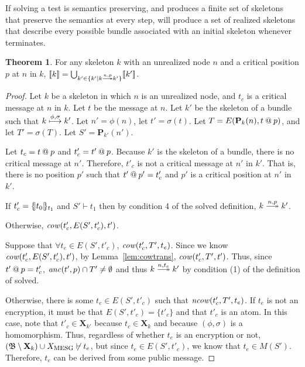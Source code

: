 \documentclass[12pt]{article}
\theoremstyle{definition}
\newtheorem{thm}{Theorem}[section]
\newcommand{\scap}[1]{\ensuremath{\mathop{\relax
                    \smash{\mbox{\sc#1}}}\!\mathop{\vphantom{#1}}\nolimits}}
\newcommand{\base}{\ensuremath{\mathfrak B}}
\newcommand{\solve}[1]{\stackrel{#1}{\longtwoheadrightarrow}}
\newcommand{\pubmsg}{\mathbf{P}}
\newcommand{\excl}{\mathbf{X}}
\newcommand{\anc}{\fn{anc}}
\newcommand{\mcow}{\fn{cow}}
\newcommand{\mncow}{\fn{ncow}}
\begin{document}
If solving a test is semantics preserving, and {\cpsa} produces a
finite set of skeletons that preserve the semantics at every step,
{\cpsa} will produce a set of realized skeletons that describe every
possible bundle associated with an initial skeleton whenever {\cpsa}
terminates.

\begin{thm}
For any skeleton $k$ with an unrealized node $n$ and a critical position
$p$ at $n$ in $k$,
$\sembrack{k}=\bigcup_{k'\in\{k'\mid k\solve{n,p}k'\}}\sembrack{k'}$.
\end{thm}

\begin{proof}
Let $k$ be a skeleton in which $n$ is an unrealized node, and $t_c$ is a
critical message at $n$ in $k$.  Let $t$ be the message at $n$.  Let $k'$ be the
skeleton of a bundle such that $k \stackrel{\phi,\sigma}{\longmapsto} k'$.
Let $n' = \phi(n)$, let $t' = \sigma(t)$.
Let $T = E(\pubmsg_k(n),t \termat p)$, and let $T' = \sigma(T)$.  Let $S' = \pubmsg_{k'}(n')$.

Let $t_c = t \mathbin{@} p$ and $t'_c = t' \mathbin{@} p$.
Because $k'$ is the skeleton of a bundle, there is no critical message at $n'$.  Therefore,
$t'_c$ is not a critical message at $n'$ in $k'$.  That is, there is no position $p'$ such that
$t' \mathbin{@} p' = t'_c$ and $p'$ is a critical position at $n'$ in $k'$.

If $t'_c = \{\!|t_0|\!\}_{t_1}$ and $S' \vdash t_1$ then by condition 4 of the solved definition,
$k\solve{n,p}k'$.

Otherwise, $\mcow(t'_c, E(S',t'_c), t')$.

Suppose that $\forall t_e \in E(S',t'_c)$, $\mcow(t'_c, T', t_e)$.  Since we know $\mcow(t'_c, E(S', t'_c), t')$,
by Lemma~\ref{lem:cowtrans}, $\mcow(t'_c, T', t')$.  Thus, since $t' \mathbin{@} p = t'_c$, $\anc(t',p) \cap T' \neq \emptyset$
and thus $k\solve{n,t_c}k'$ by condition (1) of the definition of solved.

Otherwise, there is some $t_e \in E(S', t'_c)$ such that $\mncow(t'_c, T', t_e)$.  If $t_e$ is not an encryption,
it must be that $E(S', t'_c) = \{ t'_c \}$ and that $t'_c$ is an atom.  In this case, note that $t'_c \in \excl_{k'}$
because $t_c \in \excl_k$ and because $(\phi,\sigma)$ is a homomorphism.  Thus, regardless of whether $t_e$ is an
encryption or not, $(\base\setminus\excl_k)\cup X_{\scap{mesg}} \not\vdash t_e$, but since $t_e \in E(S', t'_c)$, we know
that $t_e \in M(S')$.  Therefore, $t_e$ can be derived from some public message.


\end{proof}
\end{document}

